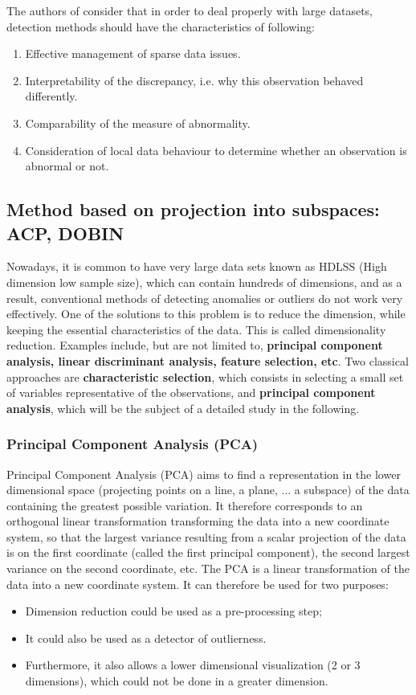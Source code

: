 \noindent The authors of \cite{AYU} consider that in order to deal properly with large datasets, detection methods should have the characteristics of following:
\begin{enumerate}[noitemsep]
\item Effective management of sparse data issues.
\item Interpretability of the discrepancy, i.e. why this observation behaved differently.
\item Comparability of the measure of abnormality.
\item Consideration of local data behaviour to determine whether an observation is abnormal or not.
\end{enumerate}
%
\subsection{Method based on projection into subspaces: ACP, DOBIN}
%
Nowadays, it is common to have very large data sets known as HDLSS (High dimension low sample size), which can contain hundreds of dimensions, and as a result, conventional methods of detecting anomalies or outliers do not work very effectively. One of the solutions to this problem is to reduce the dimension, while keeping the essential characteristics of the data. This is called dimensionality reduction. Examples include, but are not limited to, \textbf{ principal component analysis, linear discriminant analysis, feature selection, etc}. Two classical approaches are \textbf{characteristic selection}, which consists in selecting a small set of variables representative of the observations, and \textbf{principal component analysis}, which will be the subject of a detailed study in the following.
%
\subsubsection*{Principal Component Analysis (PCA)}
%
Principal Component Analysis (PCA) aims to find a representation in the lower dimensional space (projecting points on a line, a plane, ... a subspace) of the data containing the greatest possible variation. It therefore corresponds to an orthogonal linear transformation transforming the data into a new coordinate system, so that the largest variance resulting from a scalar projection of the data is on the first coordinate (called the first principal component), the second largest variance on the second coordinate, etc. The PCA is a linear transformation of the data into a new coordinate system. It can therefore be used for two purposes:
\begin{itemize}
    \item Dimension reduction could be used as a pre-processing step;
    \item It could also be used as a detector of outlierness.
    \item Furthermore, it also allows a lower dimensional visualization (2 or 3 dimensions), which could not be done in a greater dimension.
\end{itemize}

